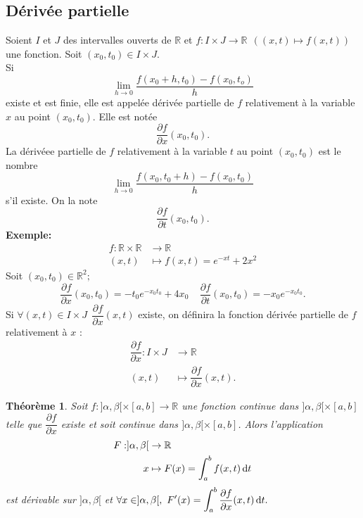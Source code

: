 \documentclass[11pt, a4paper]{book}
\newtheorem{teo}{Th\'eor\`eme}[section]
\begin{document}
\subsection{D\'eriv\'ee partielle}
Soient $I$ et $J$ des intervalles ouverts de $\mathbb{R}$ et $f:I\times J\rightarrow\mathbb{R}~~((x,t)\mapsto f(x,t))$ une fonction. Soit $(x_0,t_0)\in I\times J.$ \\
Si $$\lim_{h\rightarrow0}\dfrac{f(x_0+h,t_0)-f(x_0,t_o)}{h}$$ existe et est finie, elle est appel\'ee d\'eriv\'ee partielle de $f$ relativement \`a la variable $x$ au point $(x_0,t_0).$ Elle est not\'ee $$\dfrac{\partial f}{\partial x}(x_0,t_0).$$
La d\'eriv\'eee partielle de $f$ relativement \`a la variable $t$ au point $(x_0,t_0)$ est le nombre $$\lim_{h\rightarrow0}\dfrac{f(x_0,t_0+h)-f(x_0,t_0)}{h}$$ s'il existe. On la note $$\dfrac{\partial f}{\partial t}(x_0,t_0).$$
\textbf{Exemple:} \begin{align*}
f:\mathbb{R}\times\mathbb{R}&\rightarrow\mathbb{R}\\ (x,t)&\mapsto f(x,t)=e^{-xt}+2x^2
\end{align*}
Soit $(x_0,t_0)\in \mathbb{R}^2;$ $$ \dfrac{\partial f}{\partial x}(x_0,t_0)=-t_0e^{-x_0t_0}+4x_0~~~~~\dfrac{\partial f}{\partial t}(x_0,t_0)=-x_0e^{-x_0t_0}.$$
Si $\forall (x,t)\in I\times J~~\dfrac{\partial f}{\partial x}(x,t)$ existe, on d\'efinira la fonction d\'eriv\'ee partielle de $f$ relativement \`a $x$ : \begin{align*}
\dfrac{\partial f}{\partial x}:I\times J&\rightarrow\mathbb{R}\\ (x,t)&\mapsto \dfrac{\partial f}{\partial x}(x,t).
\end{align*}
\begin{teo} \label{teo6.3.2} Soit $f:]\alpha,\beta[\times[a,b]\rightarrow\mathbb{R}$ une fonction continue dans $]\alpha,\beta[\times[a,b]$ telle que ${\displaystyle \dfrac{\partial f}{\partial x}}$ existe et soit continue dans $]\alpha,\beta[\times[a,b]$. Alors l'application \begin{align*}
F:]\alpha,\beta[&\rightarrow\mathbb{R}\\x&\mapsto F(x)=\int_a^bf(x,t)\,\mathrm{d} t
\end{align*} est d\'erivable sur $]\alpha,\beta[$ et $\forall x\in ]\alpha,\beta[,~{\displaystyle F'(x)=\int_a^b\dfrac{\partial f}{\partial x}(x,t)\,\mathrm{d} t.}$
\end{teo}
\end{document}

